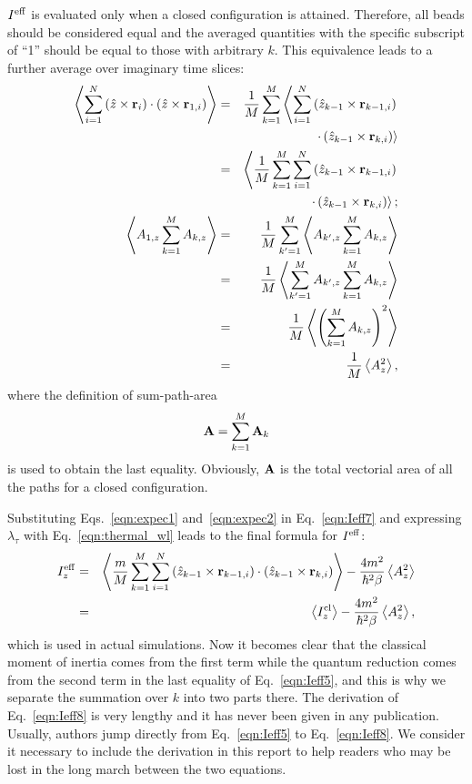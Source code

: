 \documentclass[12pt]{iopart}
\begin{document}
$I^{\rm eff}$ is evaluated only when a closed configuration is attained. Therefore, all beads should be considered equal and the averaged quantities with the specific subscript of ``1'' should be equal to  those with arbitrary $k$. This equivalence leads to a further average over imaginary time slices:
\begin{eqnarray}
\left< \sum_{i=1}^N\left(\hat{z}\times{\bf r}_i \right)\cdot\left(\hat{z}\times{\bf r}_{1,i} \right) \right>&=&\frac{1}{M}\sum_{k=1}^M\left< \sum_{i=1}^N\left(\hat{z}_{k-1}\times{\bf r}_{k-1,i} \right)\right.\nonumber\\
&&\left.\cdot\left(\hat{z}_{k-1}\times{\bf r}_{k,i} \right) \right>\nonumber\\
&=&\left<\frac{1}{M}\sum_{k=1}^M \sum_{i=1}^N\left(\hat{z}_{k-1}\times{\bf r}_{k-1,i} \right)\right.\nonumber\\
&&\left. \cdot\left(\hat{z}_{k-1}\times{\bf r}_{k,i} \right) \right>; \label{eqn:expec1}\\
\left<A_{1,z}\sum_{k=1}^MA_{k,z} \right>&=&\frac{1}{M}\sum_{k'=1}^M\left<A_{k',z}\sum_{k=1}^MA_{k,z} \right> \nonumber\\
&=&\frac{1}{M}\left<\sum_{k'=1}^MA_{k',z}\sum_{k=1}^MA_{k,z} \right>\nonumber\\
&=&\frac{1}{M}\left< \left(\sum_{k=1}^MA_{k,z}\right)^2 \right>\nonumber\\
&=&\frac{1}{M}\left< A_{z}^2 \right>, \label{eqn:expec2}
\end{eqnarray}
where the definition of sum-path-area
\begin{eqnarray}
{\bf A}=\sum_{k=1}^M{\bf A}_k
\end{eqnarray}
is used to obtain the last equality. 
Obviously, ${\bf A}$ is the total vectorial area of all the paths for a closed configuration.

Substituting Eqs.~\ref{eqn:expec1} and~\ref{eqn:expec2} in Eq.~\ref{eqn:Ieff7} and expressing $\lambda_\tau$ with Eq.~\ref{eqn:thermal_wl} leads to the final formula for $I^{\rm eff}$:
\begin{eqnarray}
I^{\rm eff}_z&=&\left<\frac{m}{M}\sum_{k=1}^M \sum_{i=1}^N\left(\hat{z}_{k-1}\times{\bf r}_{k-1,i} \right)\cdot\left(\hat{z}_{k-1}\times{\bf r}_{k,i} \right) \right>-\frac{4m^2}{\hbar^2\beta}\left< A_z^2 \right>\nonumber\\
&=&\left< I^{{\rm cl}}_z\right>-\frac{4m^2}{\hbar^2\beta}\left< A_z^2 \right>, \label{eqn:Ieff8}
\end{eqnarray} 
which is used in actual simulations. Now it becomes clear that the classical moment of inertia comes from the first term while the quantum reduction comes from the second term in the last equality of Eq.~\ref{eqn:Ieff5}, and this is why we separate the summation over $k$ into two parts there. The derivation of Eq.~\ref{eqn:Ieff8} is very lengthy and it has never been given in any publication. Usually, authors jump directly from Eq.~\ref{eqn:Ieff5} to Eq.~\ref{eqn:Ieff8}. We consider it necessary to include the derivation in this report to help readers who may be lost in the long march between the two equations.
\end{document}
